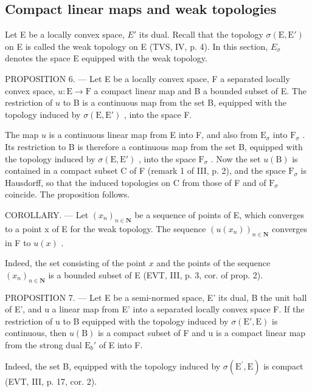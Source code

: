 \subsection{Compact linear maps and weak topologies}

Let E be a locally convex space, \(E'\) its dual. Recall that the topology \(\sigma(\mathrm{E},\mathrm{E}')\) on E is called the weak topology on E (TVS, IV, p. 4). In this section, \(E_{\sigma}\) denotes the space E equipped with the weak topology.

PROPOSITION 6. --- Let E be a locally convex space, F a separated locally convex space, \(u: \mathrm{E} \to \mathrm{F}\) a compact linear map and B a bounded subset of E. The restriction of \(u\) to B is a continuous map from the set B, equipped with the topology induced by \(\sigma(\mathrm{E}, \mathrm{E}')\) , into the space F.

The map \(u\) is a continuous linear map from E into F, and also from \(\mathrm{E}_{\sigma}\) into \(\mathrm{F}_{\sigma}\) . Its restriction to B is therefore a continuous map from the set B, equipped with the topology induced by \(\sigma(\mathrm{E}, \mathrm{E}')\) , into the space \(\mathrm{F}_{\sigma}\) . Now the set \(u(\mathrm{B})\) is contained in a compact subset C of F (remark 1 of III, p. 2), and the space \(\mathrm{F}_{\sigma}\) is Hausdorff, so that the induced topologies on C from those of F and of \(\mathrm{F}_{\sigma}\) coincide. The proposition follows.

COROLLARY. --- Let \((x_{n})_{n\in\mathbf{N}}\) be a sequence of points of E, which converges to a point x of E for the weak topology. The sequence \((u(x_{n}))_{n\in\mathbf{N}}\) converges in F to \(u(x)\) .

Indeed, the set consisting of the point \(x\) and the points of the sequence \((x_{n})_{n\in \mathbf{N}}\) is a bounded subset of E (EVT, III, p. 3, cor. of prop. 2).

PROPOSITION 7. --- Let E be a semi-normed space, E' its dual, B the unit ball of E', and u a linear map from E' into a separated locally convex space F. If the restriction of u to B equipped with the topology induced by \(\sigma(\mathrm{E}',\mathrm{E})\) is continuous, then \(u(\mathrm{B})\) is a compact subset of F and u is a compact linear map from the strong dual \(\mathrm{E}_b'\) of E into F.

Indeed, the set B, equipped with the topology induced by \(\sigma(\mathrm{E}^{\prime},\mathrm{E})\) is compact (EVT, III, p. 17, cor. 2).

